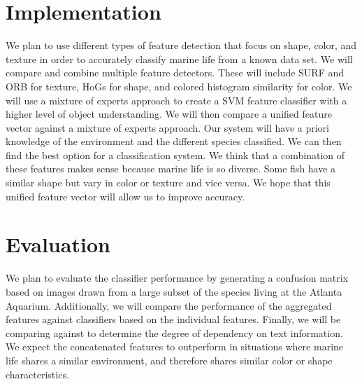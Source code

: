\documentclass[10pt,twocolumn,letterpaper]{article}
\begin{document}
\section{Implementation}
We plan to use different types of feature detection that focus on shape, color, and texture in order to accurately classify marine life from a known data set.
We will compare and combine multiple feature detectors. These will include SURF \cite{bay2006surf} and ORB \cite{rublee2011orb} for texture, HoGs \cite{dalal2005histograms} for shape, and colored histogram similarity \cite{stricker1995similarity} for color. We will use a mixture of experts approach to create a SVM feature classifier with a higher level of object understanding. We will then compare a unified feature vector against a mixture of experts approach. Our system will have a priori knowledge of the environment and the different species classified. We can then find the best option for a classification system. We think that a combination of these features makes sense because marine life is so diverse. Some fish have a similar shape but vary in color or texture and vice versa. We hope that this unified feature vector will allow us to improve accuracy.

\section{Evaluation}
We plan to evaluate the classifier performance by generating a confusion matrix based on images drawn from a large subset of the species living at the Atlanta Aquarium. 
Additionally, we will compare the performance of the aggregated features against classifiers based on the individual features.
Finally, we will be comparing against \cite{berg2006animals} to determine the degree of dependency on text information.
We expect the concatenated features to outperform in situations where marine life shares a similar environment, and therefore shares similar color or shape characteristics.


{\small


}
\end{document}
